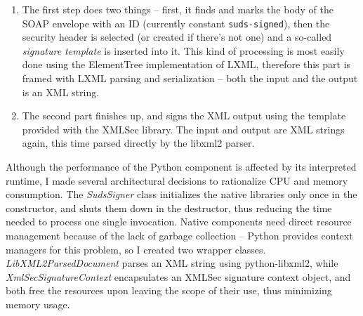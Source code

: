 \begin{enumerate}
 \item The first step does two things -- first, it finds and marks the body of the SOAP envelope with an ID (currently constant \verb|suds-signed|), then the security header is selected (or created if there's not one) and a so-called \emph{signature template} is inserted into it. This kind of processing is most easily done using the ElementTree implementation of LXML, therefore this part is framed with LXML parsing and serialization -- both the input and the output is an XML string.
 \item The second part finishes up, and signs the XML output using the template provided with the XMLSec library. The input and output are XML strings again, this time parsed directly by the libxml2 parser.
\end{enumerate}

Although the performance of the Python component is affected by its interpreted runtime, I made several architectural decisions to rationalize CPU and memory consumption. The \emph{SudsSigner} class initializes the native libraries only once in the constructor, and shuts them down in the destructor, thus reducing the time needed to process one single invocation. Native components need direct resource management because of the lack of garbage collection -- Python provides context managers for this problem, so I created two wrapper classes. \emph{LibXML2ParsedDocument} parses an XML string using python-libxml2, while \emph{XmlSecSignatureContext} encapsulates an XMLSec signature context object, and both free the resources upon leaving the scope of their use, thus minimizing memory usage.
